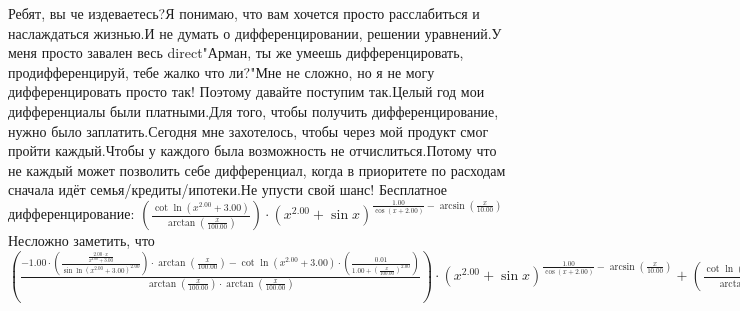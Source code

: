 Ребят, вы че издеваетесь?Я понимаю, что вам хочется просто расслабиться и наслаждаться жизнью.И не думать о дифференцировании, решении уравнений.У меня просто завален весь direct"Арман, ты же умеешь дифференцировать, продифференцируй, тебе жалко что ли?"Мне не сложно, но я не могу дифференцировать просто так! Поэтому давайте поступим так.Целый год мои дифференциалы были платными.Для того, чтобы получить дифференцирование, нужно было заплатить.Сегодня мне захотелось, чтобы через мой продукт смог пройти каждый.Чтобы у каждого была возможность не отчислиться.Потому что не каждый может позволить себе дифференциал, когда в приоритете по расходам сначала идёт семья/кредиты/ипотеки.Не упусти свой шанс! Бесплатное дифференцирование: 
$(\frac {\cot \ln (x ^ {2.00 }+ 3.00 )}{\arctan (\frac {x }{100.00 })})\cdot (x ^ {2.00 }+ \sin x )^ {\frac {1.00 }{\cos (x + 2.00 )}- \arcsin (\frac {x }{10.00 })}$
Несложно заметить, что
$(\frac {-1.00 \cdot (\frac {\frac {2.00 \cdot x }{x ^ {2.00 }+ 3.00 }}{\sin \ln (x ^ {2.00 }+ 3.00 )^ {2.00 }})\cdot \arctan (\frac {x }{100.00 })- \cot \ln (x ^ {2.00 }+ 3.00 )\cdot (\frac {0.01 }{1.00 + (\frac {x }{100.00 })^ {2.00 }})}{\arctan (\frac {x }{100.00 })\cdot \arctan (\frac {x }{100.00 })})\cdot (x ^ {2.00 }+ \sin x )^ {\frac {1.00 }{\cos (x + 2.00 )}- \arcsin (\frac {x }{10.00 })}+ (\frac {\cot \ln (x ^ {2.00 }+ 3.00 )}{\arctan (\frac {x }{100.00 })})\cdot (x ^ {2.00 }+ \sin x )^ {\frac {1.00 }{\cos (x + 2.00 )}- \arcsin (\frac {x }{10.00 })}\cdot ((\frac {1.00 }{\cos (x + 2.00 )}- \arcsin (\frac {x }{10.00 }))\cdot (\frac {2.00 \cdot x + \cos x }{x ^ {2.00 }+ \sin x })+ \ln (x ^ {2.00 }+ \sin x )\cdot (\frac {0.00 - -1.00 \cdot \sin (x + 2.00 )}{\cos (x + 2.00 )\cdot \cos (x + 2.00 )}- \frac {0.10 }{(1.00 - (\frac {x }{10.00 })^ {2.00 })^ {0.50 }}))$
